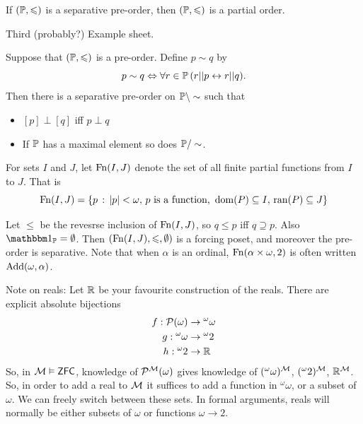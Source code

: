 \documentclass{article}
\begin{document}
\begin{fancyprop}{}
    If $(\mathbb{P}, \leqslant)$ is a separative pre-order, then $(\mathbb{P}, \leqslant)$ is a partial order.
\end{fancyprop}
\proof Third (probably?) Example sheet.
\begin{fancyprop}{}
    Suppose that $(\mathbb{P}, \leqslant)$ is a pre-order. Define $p \sim q$ by \[ p \sim q \Leftrightarrow \forall r \in \mathbb{P} \, (r || p \leftrightarrow r ||q).\]
    Then there is a separative pre-order on $\mathbb{P} \setminus \sim$ such that \begin{itemize}
        \item $[p] \perp [q]$ iff $p \perp q$
        \item If $\mathbb{P}$ has a maximal element so does $\mathbb{P}/\sim$.
    \end{itemize}
\end{fancyprop}
\begin{ex}
    For sets $I$ and $J$, let $\operatorname{Fn}(I,J)$ denote the set of all finite partial functions from $I$ to $J$. That is \[ \operatorname{Fn}(I,J) = \{ p \, : \, |p|<\omega, \, p \text{ is a function, } \operatorname{dom}(P) \subseteq I, \, \operatorname{ran}(P)\subseteq J\}\]
\end{ex}
Let $\leq$ be the revesrse inclusion of $\operatorname{Fn}(I,J)$, so $q \leq p$ iff $q \supseteq p$. Also $\bbone_{\bbP} = \emptyset$. Then $(\operatorname{Fn}(I,J),\leqslant, \emptyset)$ is a forcing poset, and moreover the pre-order is separative.\gap
Note that when $\alpha$ is an ordinal, $\operatorname{Fn}(\alpha \times \omega, 2)$ is often written $\operatorname{Add}(\omega,\alpha)$.
\newlec
\begin{remark*}
    Note on reals: Let $\mathbb{R}$ be your favourite construction of the reals. There are explicit absolute bijections \begin{align*}
        f: \mathcal{P}(\omega)      & \to {} ^{\omega}\omega \\
        g: {} ^{\omega}\omega & \to {} ^{\omega}2      \\
        h: {} ^{\omega}2      & \to \mathbb{R}               \\
    \end{align*}
    So, in $\mathcal{M} \vDash \mathsf{ZFC}$, knowledge of $\mathcal{P}^{\mathcal{M}}(\omega)$ gives knowledge of $(^{\omega}\omega)^{\mathcal{M}}$, $(^{\omega}2)^{\mathcal{M}}$, $\mathbb{R}^{\mathcal{M}}$.
    So, in order to add a real to $\mathcal{M}$ it suffices to add a function in $^{\omega}\omega$, or a subset of $\omega$. We can freely switch between these sets. In formal arguments, reals will normally be either subsets of $\omega$ or functions $\omega \to 2$.
\end{remark*}
\end{document}
